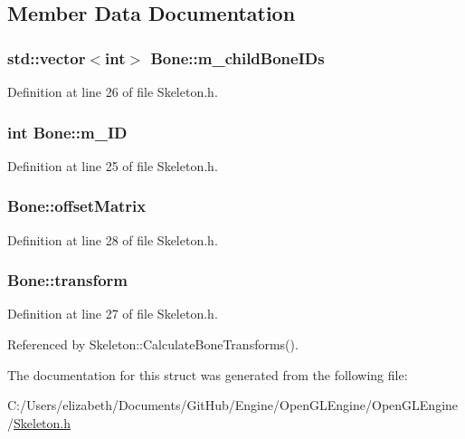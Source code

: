 \subsection{Member Data Documentation}
\subsubsection[{\texorpdfstring{m\+\_\+child\+Bone\+I\+Ds}{m_childBoneIDs}}]{\setlength{\rightskip}{0pt plus 5cm}std\+::vector$<$int$>$ Bone\+::m\+\_\+child\+Bone\+I\+Ds}\hypertarget{struct_bone_a00052ee6d532b058efa699b9b21e61f2}{}\label{struct_bone_a00052ee6d532b058efa699b9b21e61f2}


Definition at line 26 of file Skeleton.\+h.

\subsubsection[{\texorpdfstring{m\+\_\+\+ID}{m_ID}}]{\setlength{\rightskip}{0pt plus 5cm}int Bone\+::m\+\_\+\+ID}\hypertarget{struct_bone_ae27ac3ac39d8e707ba29f09a073564da}{}\label{struct_bone_ae27ac3ac39d8e707ba29f09a073564da}


Definition at line 25 of file Skeleton.\+h.

\subsubsection[{\texorpdfstring{offset\+Matrix}{offsetMatrix}}]{ Bone\+::offset\+Matrix}\hypertarget{struct_bone_a842ad02b3b17a412a3fd505081c186db}{}\label{struct_bone_a842ad02b3b17a412a3fd505081c186db}


Definition at line 28 of file Skeleton.\+h.

\subsubsection[{\texorpdfstring{transform}{transform}}]{ Bone\+::transform}\hypertarget{struct_bone_a24c5bc5cfeb022d82677b5f786d74ff2}{}\label{struct_bone_a24c5bc5cfeb022d82677b5f786d74ff2}


Definition at line 27 of file Skeleton.\+h.



Referenced by Skeleton\+::\+Calculate\+Bone\+Transforms().



The documentation for this struct was generated from the following file\+:\begin{DoxyCompactItemize}
\item 
C\+:/\+Users/elizabeth/\+Documents/\+Git\+Hub/\+Engine/\+Open\+G\+L\+Engine/\+Open\+G\+L\+Engine/\hyperlink{_skeleton_8h}{Skeleton.\+h}\end{DoxyCompactItemize}
